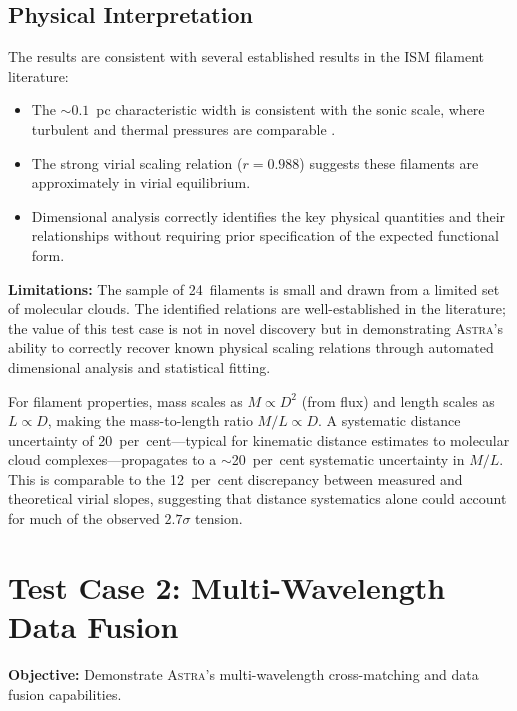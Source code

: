 \documentclass[usenatbib]{rasti}
\newcommand{\astra}{\textsc{Astra}\xspace}
\begin{document}
\subsection{Physical Interpretation}
\label{sec:tc1:interpretation}

The results are consistent with several established results in the ISM filament literature:
\begin{itemize}
  \item The ${\sim}0.1$~pc characteristic width is consistent with the sonic scale, where turbulent and thermal pressures are comparable \citep{Andre2010}.
  \item The strong virial scaling relation ($r = 0.988$) suggests these filaments are approximately in virial equilibrium.
  \item Dimensional analysis correctly identifies the key physical quantities and their relationships without requiring prior specification of the expected functional form.
\end{itemize}

\textbf{Limitations:} The sample of 24~filaments is small and drawn from a limited set of molecular clouds.
The identified relations are well-established in the literature; the value of this test case is not in novel discovery but in demonstrating \astra's ability to correctly recover known physical scaling relations through automated dimensional analysis and statistical fitting.

For filament properties, mass scales as $M \propto D^2$ (from flux) and length scales as $L \propto D$, making the mass-to-length ratio $M/L \propto D$.
A systematic distance uncertainty of 20~per~cent---typical for kinematic distance estimates to molecular cloud complexes---propagates to a $\sim$20~per~cent systematic uncertainty in $M/L$.
This is comparable to the 12~per~cent discrepancy between measured and theoretical virial slopes, suggesting that distance systematics alone could account for much of the observed $2.7\sigma$ tension.

\section{Test Case 2: Multi-Wavelength Data Fusion}
\label{sec:tc2}

\textbf{Objective:} Demonstrate \astra's multi-wavelength cross-matching and data fusion capabilities.
\end{document}

